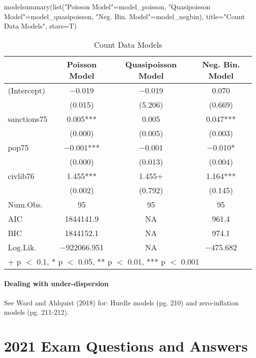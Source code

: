 \documentclass[
]{article}
\newenvironment{Shaded}{\begin{snugshade}}{\end{snugshade}}
\newcommand{\AttributeTok}[1]{\textcolor[rgb]{0.77,0.63,0.00}{#1}}
\newcommand{\FunctionTok}[1]{\textcolor[rgb]{0.00,0.00,0.00}{#1}}
\newcommand{\NormalTok}[1]{#1}
\newcommand{\OtherTok}[1]{\textcolor[rgb]{0.56,0.35,0.01}{#1}}
\newcommand{\StringTok}[1]{\textcolor[rgb]{0.31,0.60,0.02}{#1}}
\begin{document}
\begin{Shaded}
\begin{Highlighting}[]
\FunctionTok{modelsummary}\NormalTok{(}\FunctionTok{list}\NormalTok{(}\StringTok{"Poisson Model"}\OtherTok{=}\NormalTok{model\_poisson, }
                  \StringTok{"Quasipoisson Model"}\OtherTok{=}\NormalTok{model\_quasipoisson, }
                  \StringTok{"Neg. Bin. Model"}\OtherTok{=}\NormalTok{model\_negbin), }
             \AttributeTok{title=}\StringTok{"Count Data Models"}\NormalTok{, }\AttributeTok{stars=}\NormalTok{T)}
\end{Highlighting}
\end{Shaded}

\begin{table}

\caption{\label{tab:unnamed-chunk-39}Count Data Models}
\centering
\begin{tabular}[t]{lccc}
\toprule
  & Poisson Model & Quasipoisson Model & Neg. Bin. Model\\
\midrule
(Intercept) & \num{-0.019} & \num{-0.019} & \num{0.070}\\
 & (\num{0.015}) & (\num{5.206}) & (\num{0.669})\\
sanctions75 & \num{0.005}*** & \num{0.005} & \num{0.047}***\\
 & (\num{0.000}) & (\num{0.005}) & (\num{0.003})\\
pop75 & \num{-0.001}*** & \num{-0.001} & \num{-0.010}*\\
 & (\num{0.000}) & (\num{0.013}) & (\num{0.004})\\
civlib76 & \num{1.455}*** & \num{1.455}+ & \num{1.164}***\\
 & (\num{0.002}) & (\num{0.792}) & (\num{0.145})\\
\midrule
Num.Obs. & \num{95} & \num{95} & \num{95}\\
AIC & \num{1844141.9} & \num{NA} & \num{961.4}\\
BIC & \num{1844152.1} & \num{NA} & \num{974.1}\\
Log.Lik. & \num{-922066.951} & \num{NA} & \num{-475.682}\\
\bottomrule
\multicolumn{4}{l}{\rule{0pt}{1em}+ p $<$ 0.1, * p $<$ 0.05, ** p $<$ 0.01, *** p $<$ 0.001}\\
\end{tabular}
\end{table}

\hypertarget{dealing-with-under-dispersion}{%
\paragraph{Dealing with
under-dispersion}\label{dealing-with-under-dispersion}}

See Ward and Ahlquist (2018) for: Hurdle models (pg. 210) and
zero-inflation models (pg. 211-212).

\hypertarget{exam-questions-and-answers}{%
\section{2021 Exam Questions and
Answers}\label{exam-questions-and-answers}}
\end{document}
